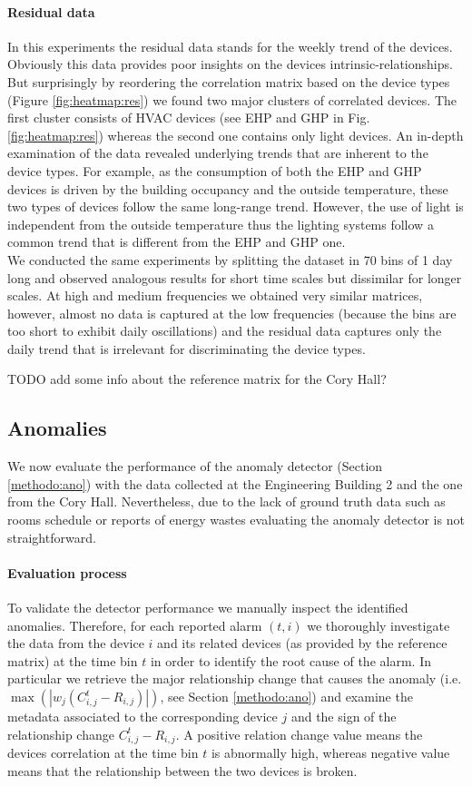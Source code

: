 \paragraph{Residual data}
In this experiments the residual data stands for the weekly trend of the devices.
Obviously this data provides poor insights on the devices intrinsic-relationships.
But surprisingly by reordering the correlation matrix based on the device types (Figure \ref{fig:heatmap:res}) we found two major clusters of correlated devices.
The first cluster consists of HVAC devices (see EHP and GHP in Fig. \ref{fig:heatmap:res}) whereas the second one contains only light devices. 
An in-depth examination of the data revealed underlying trends that are inherent to the device types. 
For example, as the consumption of both the EHP and GHP devices is driven by the building occupancy and the outside temperature, these two types of devices follow the same long-range trend. 
However, the use of light is independent from the outside temperature thus the lighting systems follow a common trend that is different from the EHP and GHP one.
~\\

We conducted the same experiments by splitting the dataset in 70 bins of 1 day long and observed analogous results for short time scales but dissimilar for longer scales.
At high and medium frequencies we obtained very similar matrices, however, almost no data is captured at the low frequencies (because the bins are too short to exhibit daily oscillations) and the residual data captures only the daily trend that is irrelevant for discriminating the device types.

TODO add some info about the reference matrix for the Cory Hall?

\subsection{Anomalies}
We now evaluate the performance of the anomaly detector (Section \ref{methodo:ano}) with the data collected at the Engineering Building 2 and the one from the Cory Hall.
Nevertheless, due to the lack of ground truth data such as rooms schedule or reports of energy wastes evaluating the anomaly detector is not straightforward.

\paragraph{Evaluation process}
To validate the detector performance we manually inspect the identified anomalies.
Therefore, for each reported alarm $(t,i)$ we thoroughly investigate the data from the device $i$ and its related devices (as provided by the reference matrix) at the time bin $t$ in order to identify the root cause of the alarm.
In particular we retrieve the major relationship change that causes the anomaly (i.e. $\max(|w_j(C_{i,j}^t - R_{i,j})|)$, see Section \ref{methodo:ano}) and examine the metadata associated to the corresponding device $j$ and the sign of the relationship change $C_{i,j}^t - R_{i,j}$.
A positive relation change value means the devices correlation at the time bin $t$ is abnormally high, whereas negative value means that the relationship between the two devices is broken.

